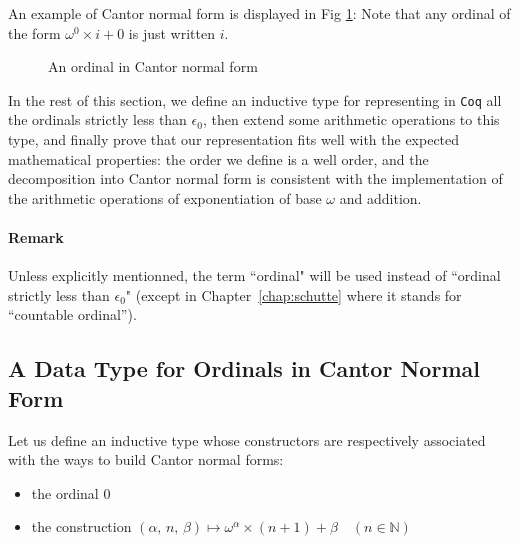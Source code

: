 An example of Cantor normal form is displayed in Fig \ref{fig:cnf-example}:
Note that  any ordinal of
the form \(\omega^0 \times i + 0\) is just written \(i\).

\begin{figure}[htb]
\centering
{}
\caption{\label{fig:cnf-example}
An ordinal in Cantor normal form}
\end{figure}




In the rest of this section, we define an inductive type for representing in \texttt{Coq}
all the ordinals strictly  less than  \(\epsilon_0\), then extend some arithmetic operations
to this type, and finally prove that our representation fits well with 
the expected mathematical properties: the order we define is a well order, 
and the decomposition into Cantor normal form  is consistent 
with the implementation of the arithmetic operations of exponentiation of base \(\omega\) 
and addition.

\paragraph*{Remark}
\label{sec:orgheadline65}
Unless explicitly mentionned, the term ``ordinal" will be used instead of
``ordinal strictly less than \(\epsilon_0\)" (except in Chapter~\ref{chap:schutte} where it stands for ``countable ordinal'').



\subsection{A Data Type for  Ordinals in Cantor Normal Form}
\label{sec:orgheadline72}
\label{sec:T1-inductive-def}





    Let us define an inductive type whose 
constructors are respectively associated
with the ways to build Cantor normal forms:

\begin{itemize}
\item the ordinal \(0\)
\item the construction \((\alpha,\, n,\,\beta)  \mapsto \omega^\alpha \times (n + 1)+ \beta \quad (n\in\mathbb{N})\)
\end{itemize}


